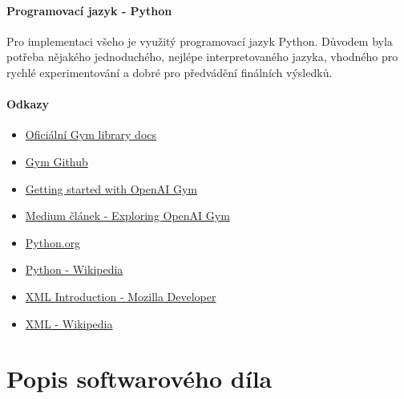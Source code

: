 \documentclass[a4paper, 12pt]{article}
\begin{document}
\paragraph{Programovací jazyk - Python} Pro implementaci všeho je využitý 
programovací jazyk Python. Důvodem byla potřeba nějakého jednoduchého, nejlépe
interpretovaného jazyka, vhodného pro rychlé experimentování a dobré pro
předvádění finálních výsledků.

\paragraph{Odkazy} 
\begin{itemize}
    \item \href{https://www.gymlibrary.ml/}{Oficiální Gym library docs}
    \item \href{https://github.com/openai/gym}{Gym Github} 
    \item \href{https://blog.paperspace.com/getting-started-with-openai-gym/}{Getting started with OpenAI Gym} 
    \item \href{https://medium.com/velotio-perspectives/exploring-openai-gym-a-platform-for-reinforcement-learning-algorithms-380beef446dc}{Medium článek - Exploring OpenAI Gym}
    \item \href{https://www.python.org/}{Python.org}
    \item \href{https://en.wikipedia.org/wiki/Python_(programming_language)}{Python - Wikipedia} 
    \item \href{https://developer.mozilla.org/en-US/docs/Web/XML/XML_introduction}{XML Introduction - Mozilla Developer} 
    \item \href{https://en.wikipedia.org/wiki/XML}{XML - Wikipedia}
\end{itemize}

\section{Popis softwarového díla}
\end{document}
